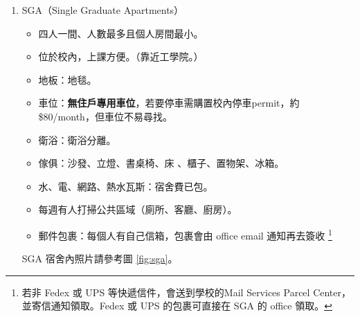 \documentclass[10pt,a4paper]{book}
\begin{document}
\begin{CJK}{UTF8}{bkai}
\begin{enumerate}
\item SGA（Single Graduate Apartments）
\begin{itemize}
\item 四人一間、人數最多且個人房間最小。
\item 位於校內，上課方便。（靠近工學院。）
\item 地板：地毯。
\item 車位：\textbf{無住戶專用車位}，若要停車需購置校內停車permit，約 \$80/month，但車位不易尋找。
\item 衛浴：衛浴分離。
\item 傢俱：沙發、立燈、書桌椅、床 、櫃子、置物架、冰箱。
\item 水、電、網路、熱水瓦斯：宿舍費已包。
\item 每週有人打掃公共區域（廁所、客廳、廚房）。
\item 郵件包裹：每個人有自己信箱，包裹會由 office email 通知再去簽收 \footnote{若非 Fedex 或 UPS 等快遞信件，會送到學校的Mail Services Parcel Center，並寄信通知領取。Fedex 或 UPS 的包裹可直接在 SGA 的 office 領取。}
\end{itemize}
SGA 宿舍內照片請參考圖 \ref{fig:sga}。


\end{enumerate}
\end{CJK}
\end{document}
